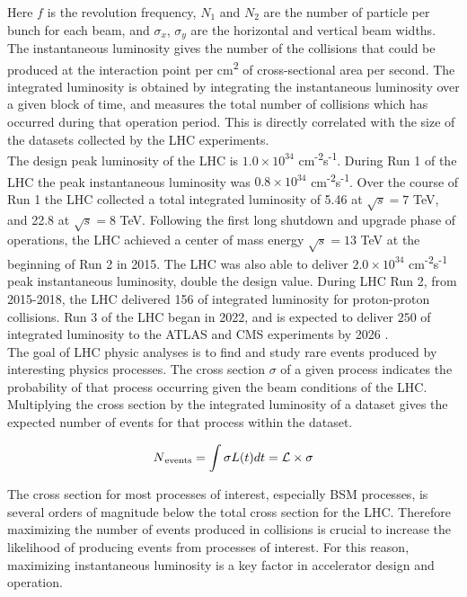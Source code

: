 Here $f$ is the revolution frequency, $N_1$ and $N_2$ are the number of particle per bunch for each beam, and $\sigma_x$, $\sigma_y$ are the horizontal and vertical beam widths. \\

The instantaneous luminosity gives the number of the collisions that could be produced at the interaction point per cm\textsuperscript{2} of cross-sectional area per second. The integrated luminosity is obtained by integrating the instantaneous luminosity over a given block of time, and measures the total number of collisions which has occurred during that operation period. This is directly correlated with the size of the datasets collected by the LHC experiments.\\
 
 The design peak luminosity of the LHC is $1.0 \times 10^{34}$ cm\textsuperscript{-2}s\textsuperscript{-1}. During Run 1 of the LHC the peak instantaneous luminosity was $0.8 \times 10^{34}$ cm\textsuperscript{-2}s\textsuperscript{-1}. Over the course of Run 1 the LHC collected a total integrated luminosity of 5.46 \invfb at $\sqrt{s} = 7$ TeV, and 22.8 \invfb at $\sqrt{s} = 8$ TeV. Following the first long shutdown and upgrade phase of operations, the LHC achieved a center of mass energy $\sqrt{s} = 13$ TeV at the beginning of Run 2 in 2015. The LHC was also able to deliver $2.0 \times 10^{34}$ cm\textsuperscript{-2}s\textsuperscript{-1} peak instantaneous luminosity, double the design value. During LHC Run 2, from 2015-2018, the LHC delivered 156 \invfb of integrated luminosity for proton-proton collisions. Run 3 of the LHC began in 2022, and is expected to deliver $250$ \invfb of integrated luminosity to the ATLAS and CMS experiments by 2026 \cite{lhc_timeline}.\\
 
The goal of LHC physic analyses is to find and study rare events produced by interesting physics processes. The cross section $\sigma$ of a given process indicates the probability of that process occurring given the beam conditions of the LHC. Multiplying the cross section by the integrated luminosity of a dataset gives the expected number of events for that process within the dataset.

 \begin{equation}
	N\textsubscript{events} = \int \sigma L(t) dt = \mathcal{L} \times \sigma
	\label{eq:xs}
\end{equation}

The cross section for most processes of interest, especially BSM processes, is several orders of magnitude below the total cross section for the LHC. Therefore maximizing the number of events produced in collisions is crucial to increase the likelihood of producing events from processes of interest. For this reason, maximizing instantaneous luminosity is a key factor in accelerator design and operation.
